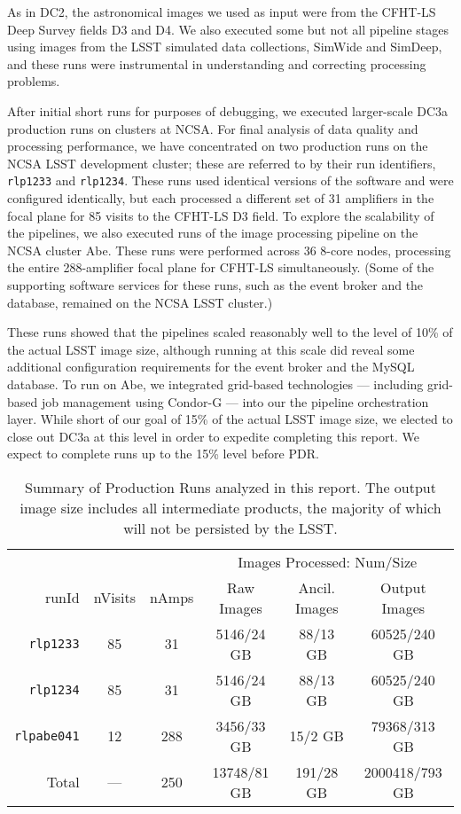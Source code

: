 As in DC2, the astronomical images we used as input were from the CFHT-LS
Deep Survey fields D3 and D4.  We also executed some but not all pipeline 
stages using images from the LSST simulated data collections, SimWide and
SimDeep, and these runs were instrumental in understanding and
correcting processing problems.

After initial short runs for purposes of debugging, 
we executed larger-scale DC3a production runs on clusters at
NCSA.  For final analysis of data quality and processing performance,
we have concentrated on two production runs on the NCSA LSST
development cluster; these are referred to by their run
identifiers, \texttt{rlp1233} and \texttt{rlp1234}. These runs used
identical versions of the software and were configured identically, but
each processed a different set of 31 amplifiers in the focal plane for 85
visits to the CFHT-LS D3 field.  To explore the scalability of
the pipelines, we also executed runs of the image processing pipeline
on the NCSA cluster Abe.  These runs were performed across 36 8-core
nodes, processing the entire 288-amplifier focal plane for CFHT-LS
simultaneously.  (Some of the supporting software services for these runs, such as
the event broker and the database, remained on the NCSA LSST cluster.)

These runs showed that the pipelines scaled reasonably well to the
level of 10\% of the actual LSST image size, although running at this scale did reveal some additional
configuration requirements for the event broker and the MySQL
database.  To run on Abe, we integrated grid-based technologies
--- including grid-based job management using Condor-G --- into our the
pipeline orchestration layer.  While short of our goal of 15\% of the actual LSST image size,
we elected to close out DC3a at this level in order to expedite completing this report.
We expect to complete runs up to the 15\% level before PDR.

\begin{table}[ht]
\centering
\caption{Summary of Production Runs analyzed in this report.  The
output image size includes all intermediate products, the majority of
which will not be persisted by the LSST.
\label{ex:tbl:runsummary}}
\vspace{\baselineskip}
\begin{tabular}{rccccc}
\hline\hline
          &         &       & \multicolumn{3}{c}{Images Processed: Num/Size} \\
runId     & nVisits & nAmps & Raw Images & Ancil. Images & Output Images \\ \hline
\texttt{rlp1233}   & 85      & 31  & 5146/24 GB    & 88/13 GB       & 60525/240 GB \\ 
\texttt{rlp1234}   & 85      & 31  & 5146/24 GB    & 88/13 GB       & 60525/240 GB \\ 
\texttt{rlpabe041} & 12      & 288 & 3456/33 GB    & 15/2 GB        & 79368/313 GB \\ \hline
Total     & ---     & 250 & 13748/81 GB   & 191/28 GB      & 2000418/793 GB \\ \hline
\end{tabular}

\end{table}

